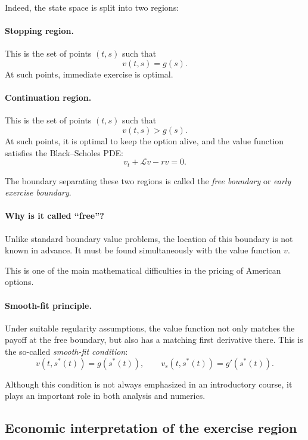 \documentclass[11pt]{article}
\theoremstyle{definition}
\theoremstyle{plain}
\begin{document}
Indeed, the state space is split into two regions:

\paragraph{Stopping region.}
This is the set of points \((t,s)\) such that
\[
v(t,s)=g(s).
\]
At such points, immediate exercise is optimal.

\paragraph{Continuation region.}
This is the set of points \((t,s)\) such that
\[
v(t,s)>g(s).
\]
At such points, it is optimal to keep the option alive, and the value
function satisfies the Black--Scholes PDE:
\[
v_t+\mathcal{L}v-rv=0.
\]

The boundary separating these two regions is called the
\emph{free boundary} or \emph{early exercise boundary}.

\paragraph{Why is it called ``free''?}
Unlike standard boundary value problems, the location of this boundary
is not known in advance.
It must be found simultaneously with the value function \(v\).

This is one of the main mathematical difficulties in the pricing of
American options.

\paragraph{Smooth-fit principle.}
Under suitable regularity assumptions, the value function not only
matches the payoff at the free boundary, but also has a matching first
derivative there.
This is the so-called \emph{smooth-fit condition}:
\[
v(t,s^*(t)) = g(s^*(t)),
\qquad
v_s(t,s^*(t)) = g'(s^*(t)).
\]

Although this condition is not always emphasized in an introductory
course, it plays an important role in both analysis and numerics.

\subsection{Economic interpretation of the exercise region}
\end{document}
